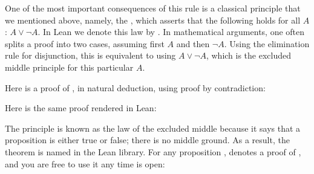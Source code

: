 \documentclass[letterpaper,10pt,english]{sphinxmanual}
\begin{document}
\sphinxAtStartPar
One of the most important consequences of this rule is a classical principle
that we mentioned above,
namely, the ,
which asserts that the following holds for all
\(A\): \(A \vee \neg A\).
In Lean we denote this law by .
In mathematical arguments, one often splits a proof into two cases,
assuming first \(A\) and then \(\neg A\).
Using the elimination rule for disjunction,
this is equivalent to using \(A \vee \neg A\),
which is the excluded middle principle for this particular \(A\).

\sphinxAtStartPar
Here is a proof of , in natural deduction, using proof by contradiction:



\begin{center}
\AXM{}
\AXM{}
\AXM{}
\BIM{\bot}
\BIM{\bot}
\DP
\end{center}

\sphinxAtStartPar
Here is the same proof rendered in Lean:

\begin{sphinxVerbatim}[commandchars=\\\{\}]
 

       
   
         
        
       
             
     
      
           
   
    

\end{sphinxVerbatim}

\sphinxAtStartPar
The principle is known as the law of the excluded middle because it says that a proposition  is either true or false;
there is no middle ground. As a result,
the theorem is named  in the Lean library.
For any proposition ,  denotes a proof of ,
and you are free to use it any time  is open:
\end{document}
